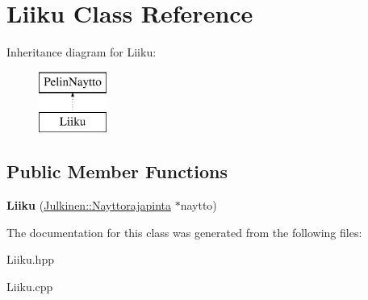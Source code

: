 \hypertarget{class_liiku}{}\section{Liiku Class Reference}
\label{class_liiku}
Inheritance diagram for Liiku\+:\begin{figure}[H]
\begin{center}
\leavevmode
\includegraphics[height=2.000000cm]{class_liiku}
\end{center}
\end{figure}
\subsection*{Public Member Functions}
\begin{DoxyCompactItemize}
\item 
\hypertarget{class_liiku_ad72b02890abf66d4d34b34dd242dbda0}{}{\bfseries Liiku} (\hyperlink{class_julkinen_1_1_nayttorajapinta}{Julkinen\+::\+Nayttorajapinta} $\ast$naytto)\label{class_liiku_ad72b02890abf66d4d34b34dd242dbda0}

\end{DoxyCompactItemize}


The documentation for this class was generated from the following files\+:\begin{DoxyCompactItemize}
\item 
Liiku.\+hpp\item 
Liiku.\+cpp\end{DoxyCompactItemize}
